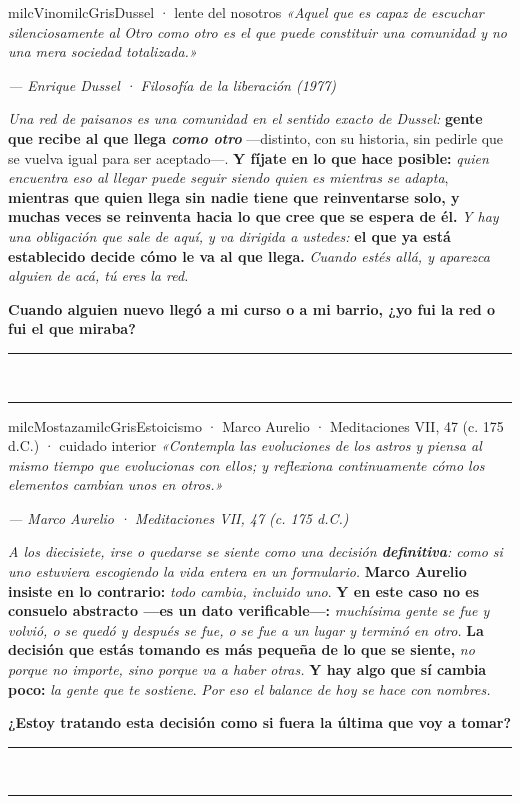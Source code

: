 \documentclass[11pt,letterpaper]{article}
\newcommand{\linead}[1]{\noindent\color{milcLinea}\rule{#1}{0.5pt}\color{milcNegro}}
\begin{document}
\begin{softbox}{milcVino}{milcGris}{Dussel · lente del nosotros}
\textit{«Aquel que es capaz de escuchar silenciosamente al Otro como otro es el que puede constituir una comunidad y no una mera sociedad totalizada.»}

{\footnotesize\itshape\color{milcNegro!70}--- Enrique Dussel · Filosofía de la liberación (1977)}

\emph{Una red de paisanos es una comunidad en el sentido exacto de Dussel:} \textbf{gente que recibe al que llega \emph{como otro}} ---distinto, con su historia, sin pedirle que se vuelva igual para ser aceptado---. \textbf{Y fíjate en lo que hace posible:} \emph{quien encuentra eso al llegar puede seguir siendo quien es mientras se adapta}, \textbf{mientras que quien llega sin nadie tiene que reinventarse solo, y muchas veces se reinventa hacia lo que cree que se espera de él.} \emph{Y hay una obligación que sale de aquí, y va dirigida a ustedes:} \textbf{el que ya está establecido decide cómo le va al que llega.} \emph{Cuando estés allá, y aparezca alguien de acá, tú eres la red.}

\textbf{Cuando alguien nuevo llegó a mi curso o a mi barrio, ¿yo fui la red o fui el que miraba?}
\end{softbox}
\linead{\linewidth}\\[1mm]
\linead{\linewidth}

\begin{softbox}{milcMostaza}{milcGris}{Estoicismo · Marco Aurelio · Meditaciones VII, 47 (c. 175 d.C.) · cuidado interior}
\textit{«Contempla las evoluciones de los astros y piensa al mismo tiempo que evolucionas con ellos; y reflexiona continuamente cómo los elementos cambian unos en otros.»}

{\footnotesize\itshape\color{milcNegro!70}--- Marco Aurelio · Meditaciones VII, 47 (c. 175 d.C.)}

\emph{A los diecisiete, irse o quedarse se siente como una decisión \textbf{definitiva}: como si uno estuviera escogiendo la vida entera en un formulario.} \textbf{Marco Aurelio insiste en lo contrario:} \emph{todo cambia, incluido uno}. \textbf{Y en este caso no es consuelo abstracto ---es un dato verificable---:} \emph{muchísima gente se fue y volvió, o se quedó y después se fue, o se fue a un lugar y terminó en otro.} \textbf{La decisión que estás tomando es más pequeña de lo que se siente,} \emph{no porque no importe, sino porque va a haber otras.} \textbf{Y hay algo que sí cambia poco:} \emph{la gente que te sostiene}. \emph{Por eso el balance de hoy se hace con nombres.}

\textbf{¿Estoy tratando esta decisión como si fuera la última que voy a tomar?}
\end{softbox}
\linead{\linewidth}\\[1mm]
\linead{\linewidth}
\end{document}

